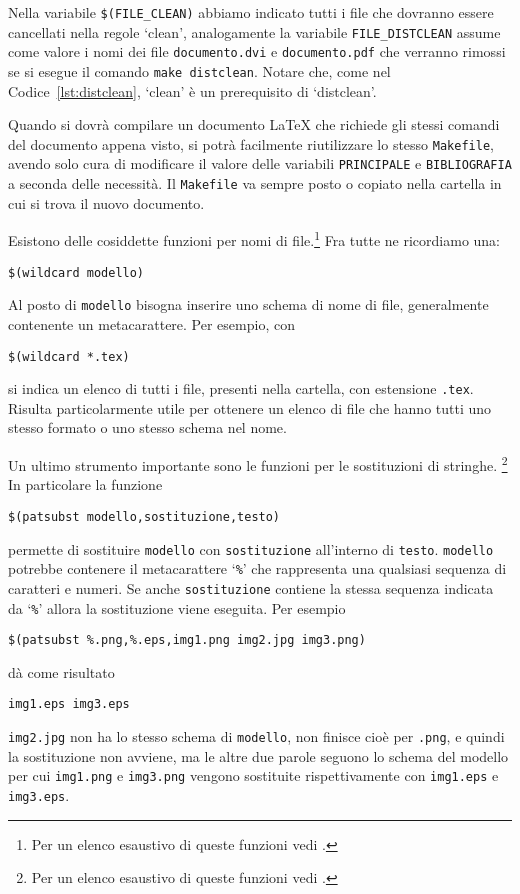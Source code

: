 Nella variabile \verb|$(FILE_CLEAN)|
abbiamo indicato tutti i file che dovranno essere cancellati nella regole
`clean', analogamente la variabile \verb|FILE_DISTCLEAN| assume come valore i
nomi dei file \verb|documento.dvi| e \verb|documento.pdf| che verranno rimossi
se si esegue il comando \verb|make distclean|.  Notare che, come nel
Codice~\ref{lst:distclean}, `clean' è un prerequisito di `distclean'.

Quando si dovrà compilare un documento \LaTeX{}
che richiede gli stessi comandi del documento appena visto, si potrà facilmente
riutilizzare lo stesso \verb|Makefile|, avendo solo cura di modificare il valore
delle variabili \verb|PRINCIPALE| e \verb|BIBLIOGRAFIA| a seconda delle
necessità. Il \verb|Makefile| va sempre posto o copiato nella cartella in cui si
trova il nuovo documento.

Esistono delle cosiddette funzioni per nomi di
file.\footnote{Per un elenco esaustivo di queste funzioni vedi
  \textcite[83]{gnu:make}.} Fra tutte ne ricordiamo una:
\begin{lstlisting}
$(wildcard modello)
\end{lstlisting}
Al posto di \verb|modello| bisogna inserire uno schema di nome di file,
generalmente contenente un metacarattere. Per esempio, con
\begin{lstlisting}
$(wildcard *.tex)
\end{lstlisting}
si indica un elenco di tutti i file, presenti nella cartella, con estensione
\verb|.tex|.  Risulta particolarmente utile per ottenere un elenco di file che
hanno tutti uno stesso formato o uno stesso schema nel nome.

Un ultimo strumento importante sono le funzioni per le sostituzioni di
stringhe.%
\footnote{Per un elenco esaustivo di queste funzioni vedi
  \textcite[80]{gnu:make}.}  In particolare la funzione
\begin{lstlisting}
$(patsubst modello,sostituzione,testo)
\end{lstlisting}
permette di sostituire \verb|modello| con \verb|sostituzione| all'interno di
\verb|testo|.  \verb|modello| potrebbe contenere il metacarattere `\verb|%|' che
rappresenta una qualsiasi sequenza di caratteri e numeri.  Se anche
\verb|sostituzione| contiene la stessa sequenza indicata da `\verb|%|' allora
la sostituzione viene eseguita.  Per esempio
\begin{lstlisting}
$(patsubst %.png,%.eps,img1.png img2.jpg img3.png)
\end{lstlisting}
dà come risultato
\begin{verbatim}
img1.eps img3.eps
\end{verbatim}
\verb|img2.jpg| non ha lo stesso schema di \verb|modello|, non finisce cioè per
\verb|.png|, e quindi la sostituzione non avviene, ma le altre due parole
seguono lo schema del modello per cui \verb|img1.png| e \verb|img3.png| vengono
sostituite rispettivamente con \verb|img1.eps| e \verb|img3.eps|.


